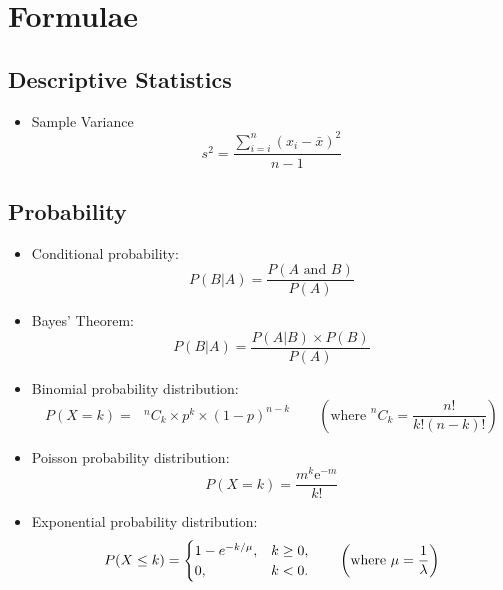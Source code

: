 \newpage
\section*{Formulae}
\subsection*{Descriptive Statistics}
\begin{itemize}
\item Sample Variance
\begin{equation*}
s^2 = \frac{\sum^{n}_{i=i} (x_i-\bar{x})^2}{n-1}
\end{equation*}
\end{itemize}
\subsection*{Probability}
\begin{itemize}

\item Conditional probability:
\begin{equation*}
P(B|A)=\frac{P\left( A\text{ and }B\right) }{P\left( A\right) }
\end{equation*}


\item Bayes' Theorem:
\begin{equation*}
P(B|A)=\frac{P\left(A|B\right) \times P(B) }{P\left( A\right) }
\end{equation*}





\item Binomial probability distribution:
\begin{equation*}
P(X = k) = \text{  }^{n}C_{k} \times p^{k} \times \left( 1-p\right) ^{n-k}\qquad \left( \text{where  }
^{n}C_{k} =\frac{n!}{k!\left(n-k\right) !} \right)
\end{equation*}

\item Poisson probability distribution:
\begin{equation*}
P(X = k) =\frac{m^{k}\mathrm{e}^{-m}}{k!}
\end{equation*}

\item Exponential probability distribution:
\begin{equation*}
P(X \leq k) = \begin{cases}
1-e^{- k/\mu}, & k \ge 0, \\
0, & k < 0.
\end{cases}\qquad \left( \text{where  }
\mu = {1\over \lambda}\right)
\end{equation*}
\end{itemize}

